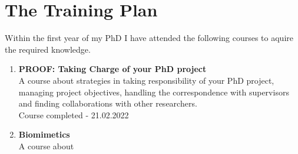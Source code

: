 \chapter{The Training Plan} \label{chap:trainingPlan}


Within the first year of my PhD I have attended the following courses to aquire the required knowledge.

\begin{enumerate}
\item \textbf{PROOF: Taking Charge of your PhD project} \\
    A course about strategies in taking responsibility of your PhD project, managing project objectives, handling the correspondence with supervisors
    and finding collaborations with other researchers. \\
    Course completed - 21.02.2022
\item \textbf{Biomimetics} \\
    A course about

\end{enumerate}
